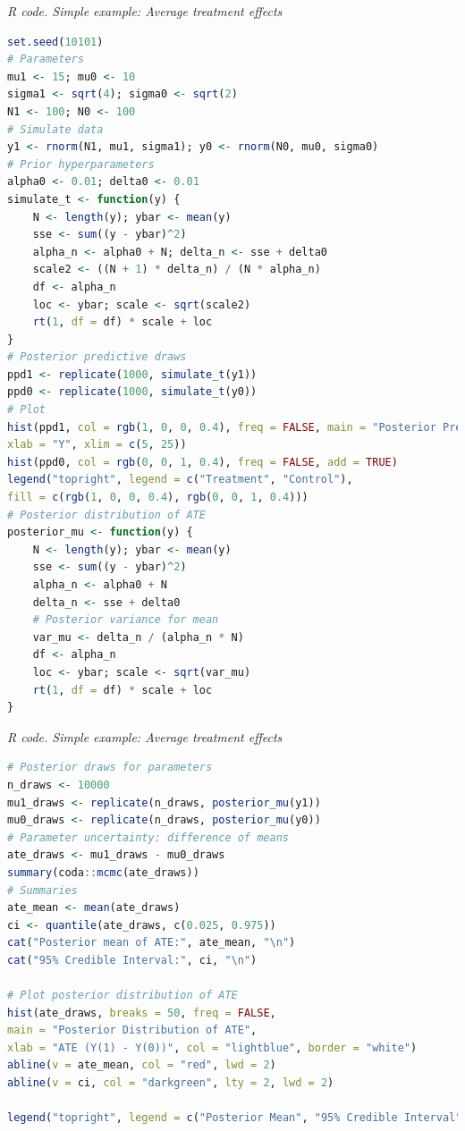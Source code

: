 \begin{tcolorbox}[enhanced,width=4.67in,center upper,
	fontupper=\large\bfseries,drop shadow southwest,sharp corners]\label{code0_chap12}
	\textit{R code. Simple example: Average treatment effects}
	\begin{VF}
		\begin{lstlisting}[language=R]		
set.seed(10101)
# Parameters
mu1 <- 15; mu0 <- 10
sigma1 <- sqrt(4); sigma0 <- sqrt(2)
N1 <- 100; N0 <- 100
# Simulate data
y1 <- rnorm(N1, mu1, sigma1); y0 <- rnorm(N0, mu0, sigma0)
# Prior hyperparameters
alpha0 <- 0.01; delta0 <- 0.01
simulate_t <- function(y) {
	N <- length(y); ybar <- mean(y)
	sse <- sum((y - ybar)^2)
	alpha_n <- alpha0 + N; delta_n <- sse + delta0
	scale2 <- ((N + 1) * delta_n) / (N * alpha_n)
	df <- alpha_n
	loc <- ybar; scale <- sqrt(scale2)
	rt(1, df = df) * scale + loc
}
# Posterior predictive draws
ppd1 <- replicate(1000, simulate_t(y1))
ppd0 <- replicate(1000, simulate_t(y0))
# Plot
hist(ppd1, col = rgb(1, 0, 0, 0.4), freq = FALSE, main = "Posterior Predictive",
xlab = "Y", xlim = c(5, 25))
hist(ppd0, col = rgb(0, 0, 1, 0.4), freq = FALSE, add = TRUE)
legend("topright", legend = c("Treatment", "Control"),
fill = c(rgb(1, 0, 0, 0.4), rgb(0, 0, 1, 0.4)))
# Posterior distribution of ATE
posterior_mu <- function(y) {
	N <- length(y); ybar <- mean(y)
	sse <- sum((y - ybar)^2)
	alpha_n <- alpha0 + N
	delta_n <- sse + delta0
	# Posterior variance for mean
	var_mu <- delta_n / (alpha_n * N)
	df <- alpha_n
	loc <- ybar; scale <- sqrt(var_mu)
	rt(1, df = df) * scale + loc
}
\end{lstlisting}
	\end{VF}
\end{tcolorbox} 

\begin{tcolorbox}[enhanced,width=4.67in,center upper,
	fontupper=\large\bfseries,drop shadow southwest,sharp corners]\label{code0_chap12}
	\textit{R code. Simple example: Average treatment effects}
	\begin{VF}
		\begin{lstlisting}[language=R]		
# Posterior draws for parameters
n_draws <- 10000
mu1_draws <- replicate(n_draws, posterior_mu(y1))
mu0_draws <- replicate(n_draws, posterior_mu(y0))
# Parameter uncertainty: difference of means
ate_draws <- mu1_draws - mu0_draws
summary(coda::mcmc(ate_draws))
# Summaries
ate_mean <- mean(ate_draws)
ci <- quantile(ate_draws, c(0.025, 0.975))
cat("Posterior mean of ATE:", ate_mean, "\n")
cat("95% Credible Interval:", ci, "\n")

# Plot posterior distribution of ATE
hist(ate_draws, breaks = 50, freq = FALSE,
main = "Posterior Distribution of ATE",
xlab = "ATE (Y(1) - Y(0))", col = "lightblue", border = "white")
abline(v = ate_mean, col = "red", lwd = 2)
abline(v = ci, col = "darkgreen", lty = 2, lwd = 2)

legend("topright", legend = c("Posterior Mean", "95% Credible Interval"), col = c("red", "darkgreen"), lwd = 2, lty = c(1, 2), bty = "n", cex = 0.8)  # Smaller legend using cex
\end{lstlisting}
	\end{VF}
\end{tcolorbox}  
 


